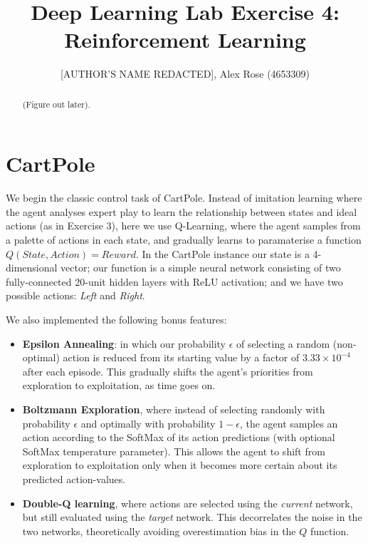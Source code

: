 \documentclass[a4paper, 11pt, conference]{ieeeconf}      %
\title{\LARGE \bf
Deep Learning Lab Exercise 4: Reinforcement Learning}
\author{[AUTHOR'S NAME REDACTED], Alex Rose (4653309)}
\begin{document}



\maketitle


\begin{abstract}

(Figure out later).

\end{abstract}



\section{CartPole}

We begin the classic control task of CartPole. Instead of imitation learning where the agent analyses expert play to learn the relationship between states and ideal actions (as in Exercise 3), here we use Q-Learning, where the agent samples from a palette of actions in each state, and gradually learns to paramaterise a function $Q(State, Action) = Reward$. In the CartPole instance our state is a 4-dimensional vector; our function is a simple neural network consisting of two fully-connected 20-unit hidden layers with ReLU activation; and we have two possible actions: \textit{Left} and \textit{Right}.

We also implemented the following bonus features:

\begin{itemize}
	\item \textbf{Epsilon Annealing}: in which our probability $\epsilon$ of selecting a random (non-optimal) action is reduced from its starting value by a factor of $3.33 \times 10^{-4}$ after each episode. This gradually shifts the agent's priorities from exploration to exploitation, as time goes on.
	
	\item \textbf{Boltzmann Exploration}, where instead of selecting randomly with probability $\epsilon$ and optimally with probability $1 - \epsilon$, the agent samples an action according to the SoftMax of its action predictions (with optional SoftMax temperature parameter). This allows the agent to shift from exploration to exploitation only when it becomes more certain about its predicted action-values.
	
	\item \textbf{Double-Q learning}, where actions are selected using the \textit{current} network, but still evaluated using the \textit{target} network. This decorrelates the noise in the two networks, theoretically avoiding overestimation bias in the $Q$ function.
	
\end{itemize}
\end{document}
